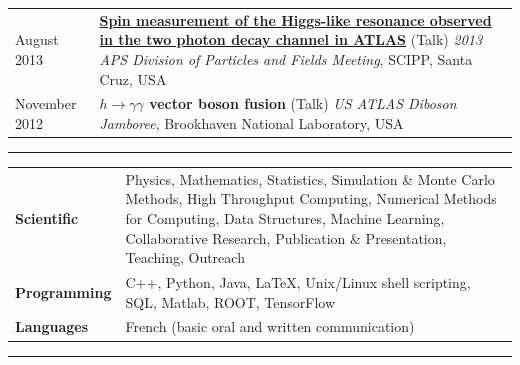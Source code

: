 \documentclass{letter}
\begin{document}
\begin{tabular}{p{}p{}}
\\
	August 2013
	&
	\href{https://indico.bnl.gov/contributionDisplay.py?contribId=155&sessionId=9&confId=603}{\textbf{Spin measurement of the Higgs-like resonance observed in the two photon decay channel in ATLAS}} (Talk) \newline
	\textit{2013 APS Division of Particles and Fields Meeting}, SCIPP, Santa Cruz, USA \newline
\\
	November 2012
	&
	\textbf{$h\rightarrow \gamma \gamma$ vector boson fusion} (Talk) \newline
	\textit{US ATLAS Diboson Jamboree}, Brookhaven National Laboratory, USA \newline
\end{tabular}

\begin{flushleft}
\Large{\textsc{\textbf{\color{Maroon}{Skills}}}}
\hrule
\end{flushleft}

\begin{tabular}{p{}p{}}
	{\bf Scientific} 
	&
	Physics, Mathematics, Statistics, Simulation \& Monte Carlo Methods, High Throughput Computing, Numerical Methods for Computing, Data Structures, Machine Learning, Collaborative Research, Publication \& Presentation, Teaching, Outreach \newline
\\
	{\bf Programming} 
	&
	C++, Python, Java, \LaTeX{}, Unix/Linux shell scripting, SQL, Matlab, ROOT, TensorFlow \newline
\\ 
	{\bf Languages}
	&
	French (basic oral and written communication)
\end{tabular}

\begin{flushleft}
\Large{\textsc{\textbf{\color{Maroon}{Volunteering \& Outreach}}}}
\hrule
\end{flushleft}
\end{document}

